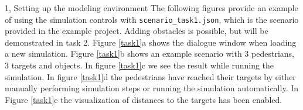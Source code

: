 \documentclass[10pt,a4paper]{article}
\begin{document}
\begin{task}{1, Setting up the modeling environment}
The following figures provide an example of using the simulation controls with \texttt{scenario\_task1.json}, which is the scenario provided in the example project. Adding obstacles is possible, but will be demonstrated in task 2. Figure \ref{task1}a shows the dialogue window when loading a new simulation. Figure \ref{task1}b shows an example scenario with 3 pedestrians, 3 targets and objects. In figure \ref{task1}c we see the result while running the simulation. In figure \ref{task1}d the pedestrians have reached their targets by either manually performing simulation steps or running the simulation automatically. In Figure \ref{task1}e the visualization of distances to the targets has been enabled.

\begin{figure}[H] 
\centering
{}

\end{figure}
\end{task}
\end{document}
